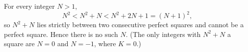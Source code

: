 For every integer $N>1$,
\[
N^2<N^2+N<N^2+2N+1=(N+1)^2 ,
\]
so $N^2+N$ lies strictly between two consecutive perfect squares and cannot be a perfect square. Hence there is $\boxed{\text{no such }N}$. (The only integers with $N^2+N$ a square are $N=0$ and $N=-1$, where $K=0$.)
